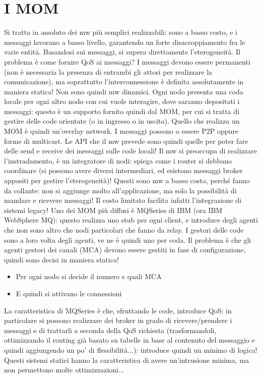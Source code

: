 \section{I MOM}
Si tratta in assoluto dei mw più semplici realizzabili: sono a basso costo, e i messaggi lavorano a basso livello,
garantendo un forte disaccoppiamento fra le varie entità. Basandosi sui messaggi, si supera direttamente l'eterogeneità.
Il problema è come fornire QoS ai messaggi? I messaggi devono essere permanenti (non è necessaria la presenza di
entrambi gli attori per realizzare la comunicazione), ma soprattutto l'interconnessione è definita assolutamente in
maniera statica! Non sono quindi mw dinamici.
Ogni nodo presenta una coda locale per ogni altro nodo con cui vuole interagire, dove saranno depositati i messaggi: questo è un supporto
fornito quindi dal MOM, per cui si tratta di gestire delle code orientate (o in ingresso o in uscita). Quello che
realizza un MOM è quindi un'overlay network.
I messaggi possono o essere P2P oppure forme di multicast. Le API che il mw prevede sono quindi quelle per poter fare
delle send e receive dei messaggi sulle code locali! Il mw si preoccupa di realizzare l'instradamento, è un
integratore di nodi: spiega come i router si debbano coordinare (si possono avere diversi intermediari, ed esistono
messaggi broker appositi per gestire l'eterogeneità)!
Questi sono mw a basso costo, perché fanno da collante: non si aggiunge molto all'applicazione, ma solo la possibilità
di mandare e ricevere messaggi! Il costo limitato facilita infatti l'integrazione di sistemi legacy!
Uno dei MOM più diffusi è MQSeries di IBM (ora IBM WebSphere MQ): questo realizza uno stub per ogni client, e introduce degli agenti che non
sono altro che nodi particolari che fanno da relay. I gestori delle code sono a loro volta degli agenti, ve ne è quindi
uno per coda. Il problema è che gli agenti gestori dei canali (MCA) devono essere gestiti in fase di configurazione,
quindi sono decisi in maniera statica!
\begin{itemize}
 \item Per ogni nodo si decide il numero e quali MCA
 \item E quindi si attivano le connessioni
\end{itemize}
La caratteristica di MQSeries è che, sfruttando le code, introduce QoS: in particolare si possono realizzare dei
broker in grado di ricevere/prendere i messaggi e di trattarli a seconda della QoS richiesta (trasformandoli,
ottimizzando il routing già basato su tabelle in base al contenuto del messaggio e quindi aggiungendo un po' di
flessibilità...): introduce quindi un minimo di logica! Questi sistemi statici hanno la caratteristica di avere
un'intrusione minima, ma non permettono molte ottimizzazioni...

